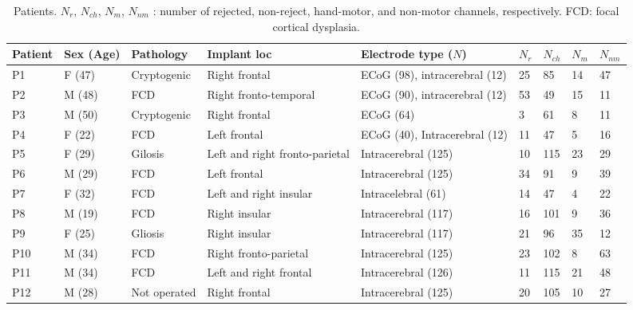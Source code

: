 \begin{table}[!htbp]
\centering
\begin{tabular}{|p{1.3cm}|p{1.05cm}|p{2.15cm}|p{2.2cm}|p{2.2cm}|p{0.5cm}|p{0.65cm}|p{0.6cm}|p{0.8cm}}
\toprule
Patient & Sex (Age) & Pathology & Implant loc & Electrode type ($N$) & $N_r$ & $N_{ch}$ & $N_{m}$ & $N_{nm}$ \\
\midrule
P1 & F (47) & Cryptogenic & Right frontal & ECoG (98), intracerebral (12) & 25 & 85 & 14 & 47 \\
\hline
P2 & M (48) & FCD & Right fronto-temporal & ECoG (90), intracerebral (12) & 53 & 49 & 15 & 11 \\
\hline
P3 & M (50) & Cryptogenic & Right frontal & ECoG (64) & 3 & 61 & 8 & 11 \\
\hline
P4 & F (22) & FCD & Left frontal & ECoG (40), Intracerebral (12) & 11 & 47 & 5 & 16 \\
\hline
P5 & F (29) & Gilosis & Left and right fronto-parietal & Intracerebral (125) & 10 & 115 & 23 & 29 \\
\hline
P6 & M (29) & FCD & Left frontal & Intracerebral (125) & 34 & 91 & 9 & 39 \\
\hline
P7 & F (32) & FCD & Left and right insular & Intracelebral (61) & 14 & 47 & 4 & 22 \\
\hline
P8 & M (19) & FCD & Right insular & Intracerebral (117) & 16 & 101 & 9 & 36 \\
\hline
P9 & F (25) & Gliosis & Right insular & Intracerebral (117) & 21 & 96 & 35 & 12 \\
\hline
P10 & M (34) & FCD & Right fronto-parietal & Intracerebral (125) & 23 & 102 & 8 & 63 \\
\hline
P11 & M (34) & FCD & Left and right frontal & Intracerebral (126) & 11 & 115 & 21 & 48 \\
\hline
P12 & M (28) & Not operated & Right frontal & Intracerebral (125) & 20 & 105 & 10 & 27 \\
\bottomrule
\end{tabular}\label{tab:table}
\caption{Patients. $N_r$, $N_{ch}$, $N_{m}$, $N_{nm}$  : number of rejected, non-reject, hand-motor, and non-motor channels, respectively. FCD: focal cortical dysplasia.}
\label{tab:patient-table}
\end{table}

